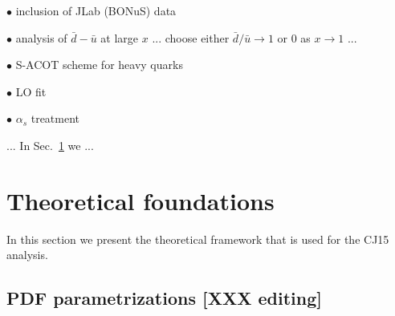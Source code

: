 \documentclass[aps,prd,amsmath,preprint]{revtex4}
\begin{document}
$\bullet$
inclusion of JLab (BONuS) data

$\bullet$
analysis of $\bar d - \bar u$ at large $x$ ... choose either
$\bar d/\bar u \to 1$ or 0 as $x \to 1$ ...

$\bullet$
S-ACOT scheme for heavy quarks

$\bullet$
LO fit

$\bullet$
$\alpha_s$ treatment



... In Sec.~\ref{sec:thy} we ...




\section{Theoretical foundations}
\label{sec:thy}

In this section we present the theoretical framework that is used for
the CJ15 analysis.


\subsection{PDF parametrizations {\color{red} [XXX editing]}}
\label{ssec:parametrizations}
\end{document}
